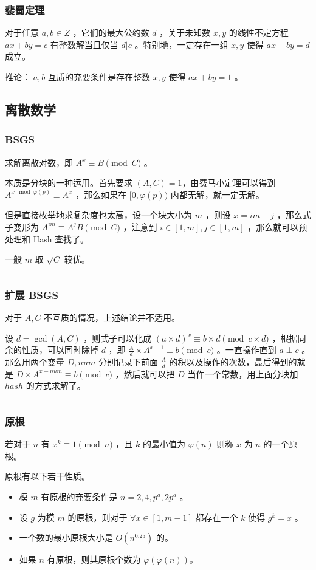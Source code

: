 \documentclass[UTF-8]{ctexart}
\newcommand{\cpp}[1]{\inputminted[bgcolor=bg,breaklines,breakanywhere=true]{c++}{#1}}
\begin{document}
			\subsubsection{裴蜀定理}
			对于任意 $a,b \in Z$ ，它们的最大公约数 $d$ ，关于未知数 $x,y$ 的线性不定方程 $ax+by=c$ 有整数解当且仅当 $d|c$ 。特别地，一定存在一组 $x,y$ 使得 $ax+by=d$ 成立。
	
			推论： $a,b$ 互质的充要条件是存在整数 $x,y$ 使得 $ax+by=1$ 。
		\subsection{离散数学}
			\subsubsection{BSGS}
			求解离散对数，即 $A^x \equiv B \pmod C$ 。
	
			本质是分块的一种运用。首先要求 $(A,C)=1$，由费马小定理可以得到 $A ^ {x \mod \varphi(p)} \equiv A ^ x$ ，那么如果在 $[0,\varphi(p))$ 内都无解，就一定无解。
	
			但是直接枚举地求复杂度也太高，设一个块大小为 $m$ ，则设 $x=im-j$ ，那么式子变形为 $A^{im} \equiv A^jB \pmod C$ ，注意到 $i \in [1,m],j \in [1,m]$ ，那么就可以预处理和 Hash 查找了。
	
			一般 $m$ 取 $\sqrt{C}$ 较优。
			\cpp{code//Math//bsgs.cpp}
			\subsubsection{扩展 BSGS}
			对于 $A,C$ 不互质的情况，上述结论并不适用。
	
			设 $d=\gcd(A,C)$ ，则式子可以化成 $(a \times d)^x \equiv b \times d \pmod {c \times d}$ ，根据同余的性质，可以同时除掉 $d$ ，即 $\frac{A}{d} \times A^{x-1} \equiv b \pmod c$ 。一直操作直到 $a \perp c$ 。那么用两个变量 $D,num$ 分别记录下前面 $\frac{A}{d}$ 的积以及操作的次数，最后得到的就是 $D \times A^{x-num} \equiv b \pmod c$ ，然后就可以把 $D$ 当作一个常数，用上面分块加 $hash$ 的方式求解了。
			
			\cpp{code//Math//exbsgs.cpp}
			\subsubsection{原根}
			若对于 $n$ 有 $x ^ k \equiv 1 \pmod n$ ，且 $k$ 的最小值为 $\varphi(n)$ 则称 $x$ 为 $n$ 的一个原根。
			
			原根有以下若干性质。
			\begin{itemize}
				\item 模 $m$ 有原根的充要条件是 $n=2,4,p^a,2p^a$ 。
				\item 设 $g$ 为模 $m$ 的原根，则对于 $\forall x \in [1,m-1]$ 都存在一个 $k$ 使得 $g^k=x$ 。
				\item 一个数的最小原根大小是 $O(n^{0.25})$ 的。
				\item 如果 $n$ 有原根，则其原根个数为 $\varphi(\varphi(n))$。
			\end{itemize}
\end{document}
